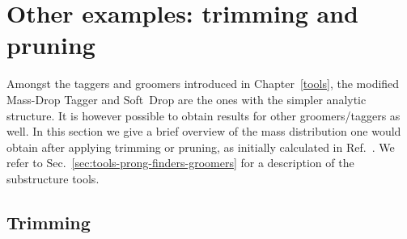 \section{Other examples: trimming and pruning}\label{sec:calc-groomed-mass-others}

Amongst the taggers and groomers introduced in Chapter~\ref{tools},
the modified Mass-Drop Tagger and Soft~Drop are the ones with the
simpler analytic structure.
%
It is however possible to obtain results for other groomers/taggers as
well. In this section we give a brief overview of the mass
distribution one would obtain after applying trimming or pruning, as
initially calculated in Ref.~\cite{Dasgupta:2013ihk}.
%
We refer to Sec.~\ref{sec:tools-prong-finders-groomers} for a
description of the substructure tools.

\subsection{Trimming}

